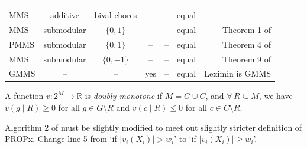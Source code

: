 \begin{table}[htb]
\begin{tabular}{lcccccr}
    & \cite{feige2022maximin}
\\[\defaultaddspace] MMS & additive & bival chores & -- & -- & equal
    & \cite{feige2022maximin}
\\[\defaultaddspace] MMS & submodular & $\{0, 1\}$ & -- & -- & equal
    & Theorem 1 of \cite{barman2021existence}
\\[\defaultaddspace] PMMS & submodular & $\{0, 1\}$ & -- & -- & equal
    & Theorem 4 of \cite{barman2021existence}
\\[\defaultaddspace] MMS & submodular & $\{0, -1\}$ & -- & -- & equal
    & Theorem 9 of \cite{barman2023fair}
\\[\defaultaddspace] GMMS & -- & -- & yes & -- & equal
    & Leximin is GMMS
\\ \bottomrule
\end{tabular}

\footnotesize
\begin{tightenum}
\item \label{foot:dbl-mono}A function $v: 2^M \to \mathbb{R}$ is \emph{doubly monotone}
    if $M = G \cup C$, and $\forall\,R \subseteq M$,
    we have $v(g \mid R) \ge 0$ for all $g \in G \setminus R$
    and $v(c \mid R) \le 0$ for all $c \in C \setminus R$.
\item \label{foot:propx-li}Algorithm 2 of \cite{li2022almost} must be slightly modified
    to meet out slightly stricter definition of PROPx.
    Change line 5 from `if $|v_i(X_i)| > w_i$' to `if $|v_i(X_i)| \ge w_i$'.
\end{tightenum}
\end{table}

